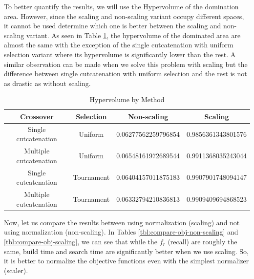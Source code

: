 To better quantify the results, we will use the Hypervolume of the domination area. However, since the scaling and non-scaling variant occupy different spaces, it cannot be used determine which one is better between the scaling and non-scaling variant. As seen in Table \ref{tbl:hv-scaling}, the hypervolume of the dominated area are almost the same with the exception of the single cutcatenation with uniform selection variant where its hypervolume is significantly lower than the rest. A similar observation can be made when we solve this problem with scaling but the difference between single cutcatenation with uniform selection and the rest is not as drastic as without scaling.

\begin{table}[ht]
    \centering
    \caption{Hypervolume by Method}
    \label{tbl:hv-scaling}
    \begin{tabular}{cccc}
        \toprule
        Crossover & Selection & Non-scaling & Scaling\\
        \midrule
        Single cutcatenation & Uniform & 0.06277562259796854 & 0.9856361343801576 \\
        Multiple cutcatenation & Uniform & 0.06548161972689544 & 0.9911368035243044 \\
        Single cutcatenation & Tournament & 0.06404157011875183 & 0.9907901748094147 \\
        Multiple cutcatenation & Tournament & 0.06332794210836813 & 0.9909409694868523 \\
        \bottomrule
    \end{tabular}
\end{table}

Now, let us compare the results between using normalization (scaling) and not using normalization (non-scaling). In Tables \ref{tbl:compare-obj-non-scaling} and \ref{tbl:compare-obj-scaling}, we can see that while the $f_r$ (recall) are roughly the same, build time and search time are significantly better when we use scaling. So, it is better to normalize the objective functions even with the simplest normalizer (scaler).

